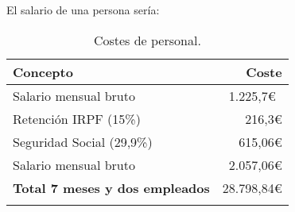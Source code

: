 El salario de una persona sería:

\begin{longtable}[]{@{}lr@{}}
	\toprule
	\begin{minipage}[b]{0.38\columnwidth}\raggedright\strut
		\textbf{Concepto}\strut
	\end{minipage} & \begin{minipage}[b]{0.20\columnwidth}\raggedright\strut
		\textbf{Coste}\strut
	\end{minipage}\tabularnewline
	\midrule
	\endhead
	\begin{minipage}[t]{0.38\columnwidth}\raggedright\strut
		Salario mensual bruto\strut
	\end{minipage} & \begin{minipage}[t]{0.20\columnwidth}\raggedright\strut
		1.225,7\euro{}~\cite{salariales}\strut
	\end{minipage}\tabularnewline
	\begin{minipage}[t]{0.38\columnwidth}\raggedright\strut
		Retención IRPF (15\%)\strut
	\end{minipage} & \begin{minipage}[t]{0.20\columnwidth}\raggedright\strut
		216,3\euro{}\strut
	\end{minipage}\tabularnewline
	\begin{minipage}[t]{0.38\columnwidth}\raggedright\strut
		Seguridad Social (29,9\%)\strut
	\end{minipage} & \begin{minipage}[t]{0.20\columnwidth}\raggedright\strut
		615,06\euro{}\strut
	\end{minipage}\tabularnewline
	\begin{minipage}[t]{0.38\columnwidth}\raggedright\strut
		Salario mensual bruto\strut
	\end{minipage} & \begin{minipage}[t]{0.20\columnwidth}\raggedright\strut
		2.057,06\euro{}\strut
	\end{minipage}\tabularnewline
	\midrule
	\begin{minipage}[t]{0.38\columnwidth}\raggedright\strut
		\textbf{Total 7 meses y dos empleados}\strut
	\end{minipage} & \begin{minipage}[t]{0.20\columnwidth}\raggedright\strut
		28.798,84\euro{}\strut
	\end{minipage}\tabularnewline
	\bottomrule
	\caption{Costes de personal.}
\end{longtable}

